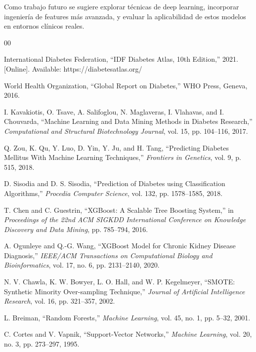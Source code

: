 \documentclass[conference]{IEEEtran}
\begin{document}
Como trabajo futuro se sugiere explorar técnicas de deep learning, incorporar ingeniería de features más avanzada, y evaluar la aplicabilidad de estos modelos en entornos clínicos reales.


\begin{thebibliography}{00}

International Diabetes Federation, ``IDF Diabetes Atlas, 10th Edition,'' 2021. [Online]. Available: https://diabetesatlas.org/

World Health Organization, ``Global Report on Diabetes,'' WHO Press, Geneva, 2016.

I. Kavakiotis, O. Tsave, A. Salifoglou, N. Maglaveras, I. Vlahavas, and I. Chouvarda, ``Machine Learning and Data Mining Methods in Diabetes Research,'' \textit{Computational and Structural Biotechnology Journal}, vol. 15, pp. 104--116, 2017.

Q. Zou, K. Qu, Y. Luo, D. Yin, Y. Ju, and H. Tang, ``Predicting Diabetes Mellitus With Machine Learning Techniques,'' \textit{Frontiers in Genetics}, vol. 9, p. 515, 2018.

D. Sisodia and D. S. Sisodia, ``Prediction of Diabetes using Classification Algorithms,'' \textit{Procedia Computer Science}, vol. 132, pp. 1578--1585, 2018.

T. Chen and C. Guestrin, ``XGBoost: A Scalable Tree Boosting System,'' in \textit{Proceedings of the 22nd ACM SIGKDD International Conference on Knowledge Discovery and Data Mining}, pp. 785--794, 2016.

A. Ogunleye and Q.-G. Wang, ``XGBoost Model for Chronic Kidney Disease Diagnosis,'' \textit{IEEE/ACM Transactions on Computational Biology and Bioinformatics}, vol. 17, no. 6, pp. 2131--2140, 2020.

N. V. Chawla, K. W. Bowyer, L. O. Hall, and W. P. Kegelmeyer, ``SMOTE: Synthetic Minority Over-sampling Technique,'' \textit{Journal of Artificial Intelligence Research}, vol. 16, pp. 321--357, 2002.

L. Breiman, ``Random Forests,'' \textit{Machine Learning}, vol. 45, no. 1, pp. 5--32, 2001.

C. Cortes and V. Vapnik, ``Support-Vector Networks,'' \textit{Machine Learning}, vol. 20, no. 3, pp. 273--297, 1995.

\end{thebibliography}
\end{document}
